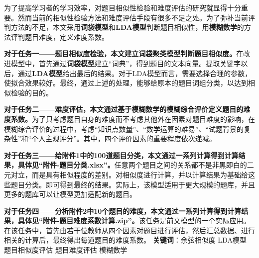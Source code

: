 为了提高学习者的学习效率，对题目相似性检验和难度评估的研究就显得十分重要。然而当前的相似性检验方法和难度评估手段有很多不足之处。为了弥补当前评判方法的不足，本文采用\textbf{词袋模型}和\textbf{LDA模型}判断题目相似性，用\textbf{模糊数学}的方法评判题目难度，定义难度系数。

\textbf{对于任务一——题目相似度检验，本文建立词袋聚类模型判断题目相似度。}在改进模型中，首先通过\textbf{词袋模型}建立“词典”，得到题目的文本向量。提取关键字以后，通过\textbf{LDA模型}给出最后的结果。对于LDA模型而言，需要选择合理的参数，使拟合效果较好。最终，通过上述的处理，能够给原本的题目词组分类，以达到相似检验的目的。

\textbf{对于任务二——难度评估，本文通过基于模糊数学的模糊综合评价定义题目的难度系数。}为了只考虑题目自身的难度而不考虑其他外在因素对题目难度的影响，在模糊综合评价的过程中，考虑“知识点数量”、“数学运算的难易”、“试题背景的复杂性”和“个人主观评分”。其中，四个评价因素的重要程度依次递减。

\textbf{对于任务三——给附件1中的100道题目分类，本文通过一系列计算得到计算结果，具体见“附件-题目分类.xlsx”。}任意两个题目之间的关系都不是非黑即白的二元对立，而是具有相似程度的差别。对相似度进行计算，并以计算结果为基础给这些题目分类。即可得到最终的结果。实际上，该模型适用于更大规模的题库，并且更多的题库可以让模型更加适配新的题目。

\textbf{对于任务四——分析附件2中10个题目的难度，本文通过一系列计算得到计算结果，具体见“附件-题目难度系数计算.zip”。}该任务是前文模型的一个实际应用。在该任务中，首先由若干位教师从四个因素对题目进行评估，然后汇总数据、进行相关的计算后，最终得出每道题目的难度系数。
\newline
\newline
\textbf{关键词}：余弦相似度 \quad LDA模型 \quad 题目相似度评估 \quad 题目难度评估 \quad 模糊数学

\newpage
\thispagestyle{empty}
\tableofcontents